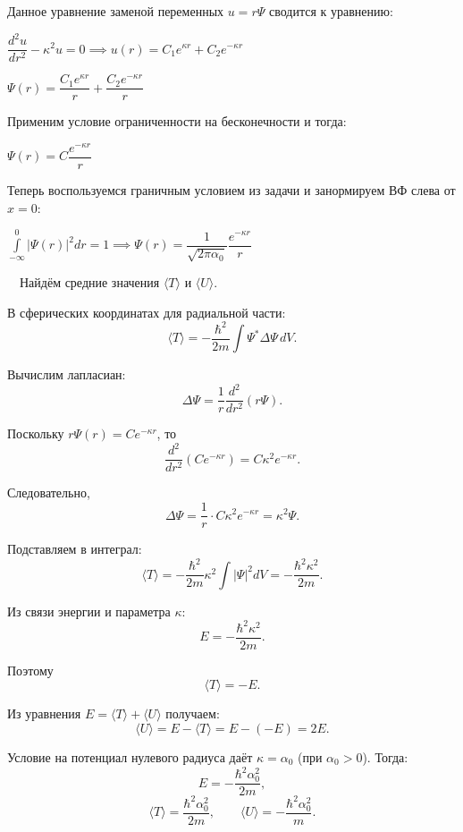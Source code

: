 \documentclass[a4paper, 12pt]{article}
\begin{document}
	\quad Данное уравнение заменой переменных $u = r\Psi$ сводится к уравнению:
	
	\begin{center}
		$\dfrac{d^2 u}{dr^2} - \kappa^2 u = 0 \implies u(r) = C_1 e^{\kappa r} + C_2 e^{-\kappa r}$
		
		$\Psi(r) = \dfrac{C_1 e^{\kappa r}}{r} + \dfrac{C_2 e^{-\kappa r}}{r}$
	\end{center}
	
	\quad Применим условие ограниченности на бесконечности и тогда: 
	
	\begin{center}
		$\Psi(r) = C \dfrac{e^{-\kappa r}}{r} $
	\end{center}
	 
	\quad Теперь воспользуемся граничным условием из задачи и занормируем ВФ слева от $x = 0$: 
	
	\begin{center}
		$\displaystyle\int\limits_{-\infty}^{0} \left|\Psi(r)\right|^2 dr = 1 \implies \Psi (r) = \dfrac{1}{\sqrt{2 \pi \alpha_0}} \dfrac{ e^{-\kappa r}}{r} $
	\end{center}
	
	$\quad \text{Найдём средние значения } \langle T \rangle \text{ и } \langle U \rangle.$

	\quad В сферических координатах для радиальной части:
	\[
	\langle T \rangle = -\frac{\hbar^2}{2m} \int \Psi^* \Delta \Psi \, dV.
	\]
	
	\quad Вычислим лапласиан:
	\[
	\Delta \Psi = \frac{1}{r} \frac{d^2}{dr^2}(r\Psi).
	\]
	
	\quad Поскольку \( r\Psi(r) = C e^{-\kappa r} \), то
	\[
	\frac{d^2}{dr^2}(C e^{-\kappa r}) = C \kappa^2 e^{-\kappa r}.
	\]
	
	\quad Следовательно,
	\[
	\Delta \Psi = \frac{1}{r} \cdot C \kappa^2 e^{-\kappa r} = \kappa^2 \Psi.
	\]
	
	\quad Подставляем в интеграл:
	\[
	\langle T \rangle = -\frac{\hbar^2}{2m} \kappa^2 \int |\Psi|^2 dV = -\frac{\hbar^2 \kappa^2}{2m}.
	\]
	
	\quad Из связи энергии и параметра \( \kappa \):
	\[
	E = -\frac{\hbar^2 \kappa^2}{2m}.
	\]
	
	\quad Поэтому
	\[
	\langle T \rangle = -E.
	\]

	\quad Из уравнения \( E = \langle T \rangle + \langle U \rangle \) получаем:
	\[
	\langle U \rangle = E - \langle T \rangle = E - (-E) = 2E.
	\]
	
	\quad Условие на потенциал нулевого радиуса даёт \( \kappa = \alpha_0 \) (при \( \alpha_0 > 0 \)). Тогда:
	\[
	E = -\frac{\hbar^2 \alpha_0^2}{2m},
	\]
	\[
	\langle T \rangle = \frac{\hbar^2 \alpha_0^2}{2m}, \qquad
	\langle U \rangle = -\frac{\hbar^2 \alpha_0^2}{m}.
	\]
	
\end{document}
